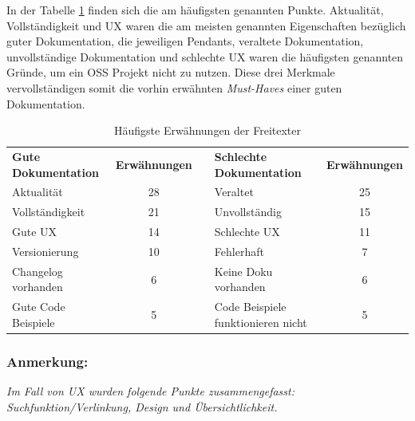 In der Tabelle \ref{tab:freitext_felder_ergebnisse} finden sich die am häufigsten genannten
Punkte. Aktualität, Vollständigkeit und UX waren die am meisten genannten Eigenschaften
bezüglich guter Dokumentation, die jeweiligen Pendants, veraltete Dokumentation, unvollständige
Dokumentation und schlechte UX waren die häufigsten genannten Gründe, um ein OSS Projekt nicht zu
nutzen. Diese drei Merkmale vervollständigen somit die vorhin erwähnten \textit{Must-Haves} einer
guten Dokumentation.

\bigskip
\begin{table}[h]
    \begin{tabular}{lcllc}
        \cline{1-2} \cline{4-5}
        \textbf{Gute Dokumentation} & \multicolumn{1}{l}{\textbf{Erwähnungen}} & \hspace{1cm} & \textbf{Schlechte Dokumentation}   & \multicolumn{1}{l}{\textbf{Erwähnungen}} \\ \cline{1-2} \cline{4-5}
        Aktualität                  & 28                                       &              & Veraltet                           & 25                                       \\
        Vollständigkeit             & 21                                       &              & Unvollständig                      & 15                                       \\
        Gute UX                     & 14                                       &              & Schlechte UX                       & 11                                       \\
        Versionierung               & 10                                       &              & Fehlerhaft                         & 7                                        \\
        Changelog vorhanden         & 6                                        &              & Keine Doku vorhanden               & 6                                        \\
        Gute Code Beispiele         & 5                                        &              & Code Beispiele funktionieren nicht & 5
    \end{tabular}%
    \caption{Häufigste Erwähnungen der Freitexter}
    \label{tab:freitext_felder_ergebnisse}
\end{table}


\subsubsection*{Anmerkung:}
\textit{Im Fall von UX wurden folgende Punkte zusammengefasst: Suchfunktion/Verlinkung, Design und
Übersichtlichkeit.}


